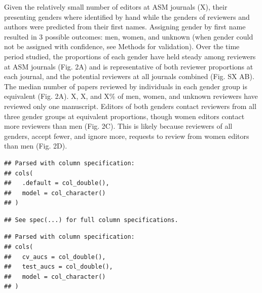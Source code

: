 \documentclass[11pt,]{article}
\begin{document}
Given the relatively small number of editors at ASM journals (X), their
presenting genders where identified by hand while the genders of
reviewers and authors were predicted from their first names. Assigning
gender by first name resulted in 3 possible outcomes: men, women, and
unknown (when gender could not be assigned with confidence, see Methods
for validation). Over the time period studied, the proportions of each
gender have held steady among reviewers at ASM journals (Fig. 2A) and is
representative of both reviewer proportions at each journal, and the
potential reviewers at all journals combined (Fig. SX AB). The median
number of papers reviewed by individuals in each gender group is
equivalent (Fig. 2A). X, X, and X\% of men, women, and unknown reviewers
have reviewed only one manuscript. Editors of both genders contact
reviewers from all three gender groups at equivalent proportions, though
women editors contact more reviewers than men (Fig. 2C). This is likely
because reviewers of all genders, accept fewer, and ignore more,
requests to review from women editors than men (Fig. 2D).

\begin{verbatim}
## Parsed with column specification:
## cols(
##   .default = col_double(),
##   model = col_character()
## )
\end{verbatim}

\begin{verbatim}
## See spec(...) for full column specifications.
\end{verbatim}

\begin{verbatim}
## Parsed with column specification:
## cols(
##   cv_aucs = col_double(),
##   test_aucs = col_double(),
##   model = col_character()
## )
\end{verbatim}
\end{document}
